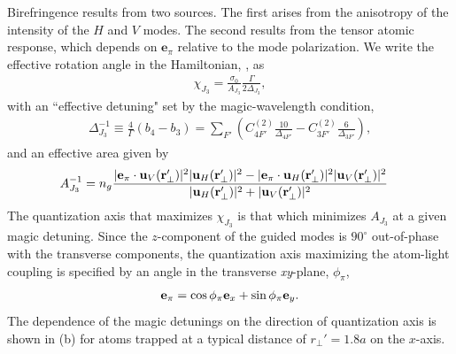 \documentclass[preprint, aps,pra,onecolumn]{revtex4-1} %
\newcommand{\qaxis}{\mathbf{e}_\pi}
\newcommand{\chieff}{\chi_{J_3}}
\newcommand{\comment}[1]{{\color{Maroon} #1}}
\begin{document}
Birefringence results from two sources.  
The first arises from the anisotropy of the intensity of the $H$ and $V$ modes.  
The second results from the tensor atomic response, which depends on $\mathbf{e}_\pi$ relative to the mode polarization. 
We write the effective rotation angle in the Hamiltonian, , as
	\begin{align} \label{Eq::chieff}
		\chieff = \frac{\sigma_0}{A_{J_3}} \frac{\Gamma}{ 2 \Delta_{J_3}},
	\end{align}
with an ``effective detuning" set by the magic-wavelength condition,
	\begin{align} \label{Eq::SqueezingEffectiveDetuning}
		 \Delta_{J_3}^{-1} \equiv \frac{4}{\Gamma} (b_4 - b_3) =   \sum_{F'}  \left( C^{(2)}_{4F'}\frac{10}{\Delta_{4F'}} -  C^{(2)}_{3F'}\frac{6}{ \Delta_{3F'} } \right),
	\end{align}
and an effective area given by
	\begin{align} \label{Eq::SqueezingModeArea}
		A_{J_3}^{-1} & = n_g \frac{ |\mathbf{e}_\pi \cdot \mathbf{u}_V(\mathbf{r}'_\perp)|^2 |\mathbf{u}_H(\mathbf{r}'_\perp)|^2 - |\mathbf{e}_\pi \cdot \mathbf{u}_H(\mathbf{r}'_\perp) |^2 |\mathbf{u}_V(\mathbf{r}'_\perp)|^2 }{ |\mathbf{u}_H(\mathbf{r}'_\perp)|^2 + |\mathbf{u}_V(\mathbf{r}'_\perp)|^2 } 
	\end{align}	
The quantization axis that maximizes $\chieff$ is that which minimizes $A_{J_3}$ at a given magic detuning.  
Since the $z$-component of the guided modes is $90^\circ$ out-of-phase with the transverse components, the quantization axis maximizing the atom-light coupling is specified by an angle in the transverse \emph{xy}-plane, $\phi_\pi$,
	\begin{align} \label{Eq::QuantizationAxis}
		\qaxis = \cos \phi_\pi \mbf{e}_x + \sin \phi_\pi \mbf{e}_y.
	\end{align}
The dependence of the magic detunings on the direction of quantization axis is shown in (b) for atoms trapped at a typical distance of $r_\perp'=1.8a$ on the $x$-axis.   
\end{document}
